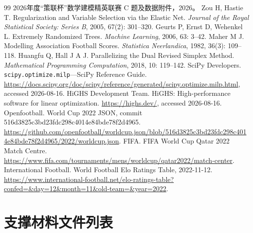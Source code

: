\documentclass[UTF8,a4paper,11pt,fontset=none]{ctexart}
\begin{document}
\begingroup
\raggedright
\sloppy
\begin{thebibliography}{99}
 2026年度“策联杯”数学建模精英联赛 C 题及数据附件，2026。
 Zou H, Hastie T. Regularization and Variable Selection via the Elastic Net. \textit{Journal of the Royal Statistical Society: Series B}, 2005, 67(2): 301--320.
 Geurts P, Ernst D, Wehenkel L. Extremely Randomized Trees. \textit{Machine Learning}, 2006, 63: 3--42.
 Maher M J. Modelling Association Football Scores. \textit{Statistica Neerlandica}, 1982, 36(3): 109--118.
 Huangfu Q, Hall J A J. Parallelizing the Dual Revised Simplex Method. \textit{Mathematical Programming Computation}, 2018, 10: 119--142.
 SciPy Developers. \texttt{scipy.optimize.milp}---SciPy Reference Guide. \url{https://docs.scipy.org/doc/scipy/reference/generated/scipy.optimize.milp.html}, accessed 2026-08-16.
 HiGHS Development Team. HiGHS: High-performance software for linear optimization. \url{https://highs.dev/}, accessed 2026-08-16.
 Openfootball. World Cup 2022 JSON, commit 516d3825c3bd23fdc298c4014e84bde78f2d4965. \url{https://github.com/openfootball/worldcup.json/blob/516d3825c3bd23fdc298c4014e84bde78f2d4965/2022/worldcup.json}.
 FIFA. FIFA World Cup Qatar 2022 Match Centre. \url{https://www.fifa.com/tournaments/mens/worldcup/qatar2022/match-center}.
 International Football. World Football Elo Ratings Table, 2022-11-12. \url{https://www.international-football.net/elo-ratings-table?confed=&day=12&month=11&old-team=&year=2022}.
\end{thebibliography}
\endgroup

\clearpage
\appendix
\section{支撑材料文件列表}
\end{document}
